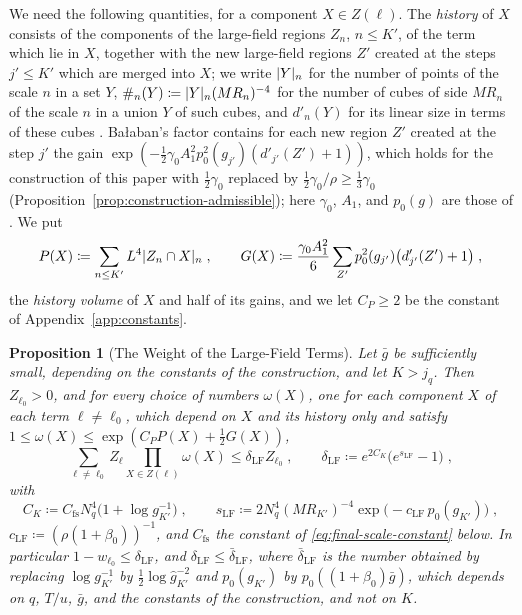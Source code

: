\documentclass[11pt]{preprint}
\DeclarePairedDelimiter{\abs}{\lvert}{\rvert}
\numberwithin{equation}{section}
\newtheorem{proposition}[theorem]{Proposition}
\theoremstyle{definition}
\theoremstyle{remark}
\theoremstyle{plain}
\begin{document}
We need the following quantities, for a component $X \in Z(\ell)$. The \emph{history} of $X$ consists of the components of the large-field regions $Z_n$, $n \leq K'$, of the term which lie in $X$, together with the new large-field regions $Z'$ created at the steps $j' \leq K'$ which are merged into $X$; we write $\abs{Y}_n$ for the number of points of the scale $n$ in a set $Y$, $\#_n(Y) \coloneqq \abs{Y}_n(MR_n)^{-4}$ for the number of cubes of side $MR_n$ of the scale $n$ in a union $Y$ of such cubes, and $d'_n(Y)$ for its linear size in terms of these cubes \cite[p.~380]{BalabanLFR2}. Ba{\l}aban's factor \cite[(1.79), p.~383]{BalabanLFR2} contains for each new region $Z'$ created at the step $j'$ the gain $\exp(-\frac12\gamma_0A_1^2p_0^2(g_{j'})(d'_{j'}(Z') + 1))$, which holds for the construction of this paper with $\frac12\gamma_0$ replaced by $\frac12\gamma_0/\rho \geq \frac13\gamma_0$ (Proposition~\ref{prop:construction-admissible}); here $\gamma_0$, $A_1$, and $p_0(g)$ are those of \cite{BalabanLFR2}. We put
\begin{equation}\label{eq:history-quantities}
    P(X) \coloneqq \sum_{n \leq K'}L^4\abs{Z_n \cap X}_n\;,
    \qquad
    G(X) \coloneqq \frac{\gamma_0A_1^2}{6}\sum_{Z'}p_0^2(g_{j'})\bigl(d'_{j'}(Z') + 1\bigr)\;,
\end{equation}
the \emph{history volume} of $X$ and half of its gains, and we let $C_P \geq 2$ be the constant of Appendix~\ref{app:constants}.

\begin{proposition}[The Weight of the Large-Field Terms]\label{prop:large-field-weight}
Let $\bar g$ be sufficiently small, depending on the constants of the construction, and let $K > j_q$. Then $Z_{\ell_0} > 0$, and for every choice of numbers $\omega(X)$, one for each component $X$ of each term $\ell \neq \ell_0$, which depend on $X$ and its history only and satisfy $1 \leq \omega(X) \leq \exp(C_PP(X) + \frac12G(X))$,
\begin{equation}\label{eq:large-field-weight}
    \sum_{\ell \neq \ell_0}Z_\ell\prod_{X \in Z(\ell)}\omega(X) \leq \delta_{\mathrm{LF}}Z_{\ell_0}\;,
    \qquad
    \delta_{\mathrm{LF}} \coloneqq e^{2C_K}\bigl(e^{s_{\mathrm{LF}}} - 1\bigr)\;,
\end{equation}
with
\begin{equation}\label{eq:large-field-constants}
    C_K \coloneqq C_{\mathrm{fs}}N_q^4\bigl(1 + \log g_{K'}^{-1}\bigr)\;,
    \qquad
    s_{\mathrm{LF}} \coloneqq 2N_q^4(MR_{K'})^{-4}\exp\bigl(-c_{\mathrm{LF}}\,p_0(g_{K'})\bigr)\;,
\end{equation}
$c_{\mathrm{LF}} \coloneqq (\rho(1 + \beta_0))^{-1}$, and $C_{\mathrm{fs}}$ the constant of \eqref{eq:final-scale-constant} below. In particular $1 - w_{\ell_0} \leq \delta_{\mathrm{LF}}$, and $\delta_{\mathrm{LF}} \leq \bar\delta_{\mathrm{LF}}$, where $\bar\delta_{\mathrm{LF}}$ is the number obtained by replacing $\log g_{K'}^{-1}$ by $\frac12\log\hat g_{K'}^{-2}$ and $p_0(g_{K'})$ by $p_0((1 + \beta_0)\bar g)$, which depends on $q$, $T/u$, $\bar g$, and the constants of the construction, and not on $K$.
\end{proposition}
\end{document}
